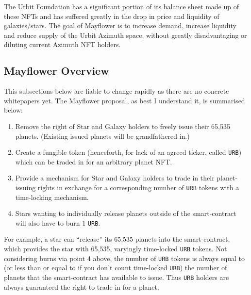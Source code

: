 \documentclass{article}
\begin{document}
	The Urbit Foundation has a significant portion of its balance sheet made up of these NFTs and has suffered greatly in the drop in price and liquidity of galaxies/stars. The goal of Mayflower is to increase demand, increase liquidity and reduce supply of the Urbit Azimuth space, without greatly disadvantaging or diluting current Azimuth NFT holders.
		
	\subsection{Mayflower Overview}
	This subsections below are liable to change rapidly as there are no concrete whitepapers yet. The Mayflower proposal, as best I understand it, is summarised below:
	\begin{enumerate}
		\item Remove the right of Star and Galaxy holders to freely issue their 65,535 planets. (Existing issued planets will be grandfathered in.)
		\item Create a fungible token (henceforth, for lack of an agreed ticker, called \texttt{URB}) which can be traded in for an arbitrary planet NFT.
		\item Provide a mechanism for Star and Galaxy holders to trade in their planet-issuing rights in exchange for a corresponding number of \texttt{URB} tokens with a time-locking mechanism.
		\item Stars wanting to individually release planets outside of the smart-contract will also have to burn 1 \texttt{URB}.
	\end{enumerate}
	For example, a star can ``release'' its 65,535 planets into the smart-contract, which provides the star with 65,535, varyingly time-locked \texttt{URB} tokens. Not considering burns via point 4 above, the number of \texttt{URB} tokens is always equal to (or less than or equal to if you don't count time-locked \texttt{URB}) the number of planets that the smart-contract has available to issue. Thus \texttt{URB} holders are always guaranteed the right to trade-in for a planet.
		
\end{document}
